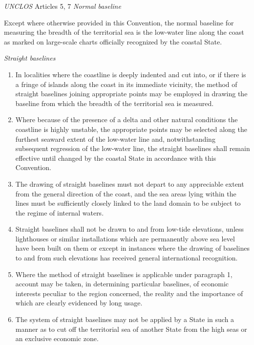 \begin{conventiondetails}{\textit{UNCLOS} Articles 5, 7}
    \flushleft
    \textit{Normal baseline}

    \vspace{\baselineskip}

    Except where otherwise provided in this Convention, the normal baseline for measuring the breadth of the territorial sea is the low-water line along the coast as marked on large-scale charts officially recognized by the coastal State.

    \textit{Straight baselines}
    \begin{enumerate}
        \item In localities where the coastline is deeply indented and cut into, or if there is a fringe of islands along the coast in its immediate vicinity, the method of straight baselines joining appropriate points may be employed in drawing the baseline from which the breadth of the territorial sea is measured.
        \item Where because of the presence of a delta and other natural conditions the coastline is highly unstable, the appropriate points may be selected along the furthest seaward extent of the low-water line and, notwithstanding subsequent regression of the low-water line, the straight baselines shall remain effective until changed by the coastal State in accordance with this Convention.
        \item The drawing of straight baselines must not depart to any appreciable extent from the general direction of the coast, and the sea areas lying within the lines must be sufficiently closely linked to the land domain to be subject to the regime of internal waters.
        \item Straight baselines shall not be drawn to and from low-tide elevations, unless lighthouses or similar installations which are permanently above sea level have been built on them or except in instances where the drawing of baselines to and from such elevations has received general international recognition.
        \item Where the method of straight baselines is applicable under paragraph 1, account may be taken, in determining particular baselines, of economic interests peculiar to the region concerned, the reality and the importance of which are clearly evidenced by long usage.
        \item The system of straight baselines may not be applied by a State in such a manner as to cut off the territorial sea of another State from the high seas or an exclusive economic zone.
    \end{enumerate}
\end{conventiondetails}

